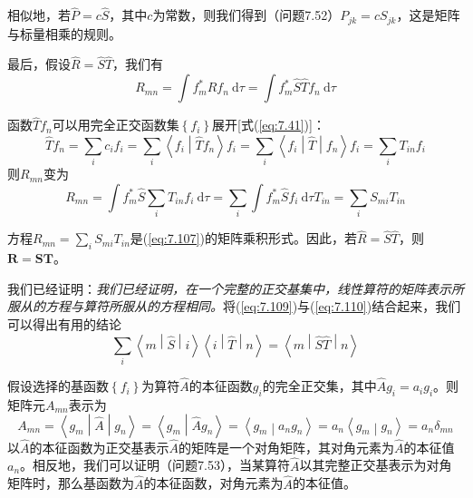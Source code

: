     相似地，若$\hat{P} = c\hat{S}$，其中$c$为常数，则我们得到（问题7.52）$P_{jk} = cS_{jk}$，这是矩阵与标量相乘的规则。

    最后，假设$\hat{R} = \hat{S}\hat{T}$，我们有
    \begin{equation}
        R_{mn} = \int f_m^{\ast}\hat{R}f_n \: \mathrm{d}\tau = \int f_m^{\ast}\hat{S}\hat{T}f_n \: \mathrm{d}\tau
        \label{eq:7.109}
    \end{equation}

    函数$\hat{T}f_n$可以用完全正交函数集$\left\{f_i\right\}$展开[式(\ref{eq:7.41})]：
    \begin{equation*}
        \hat{T}f_n = \sum_{i}c_{i}f_i = \sum_{i}\left\langle f_i \middle| \hat{T}f_n \right\rangle f_i = \sum_{i}\left\langle f_i \middle| \hat{T} \middle| f_n \right\rangle f_i = \sum_{i}T_{in}f_i
    \end{equation*}
    则$R_{mn}$变为
    \begin{equation}
        R_{mn} = \int f_m^{\ast}\hat{S}\sum_{i}T_{in}f_i \: \mathrm{d}\tau = \sum_{i}\int f_m^{\ast}\hat{S}f_i \: \mathrm{d}\tau T_{in} = \sum_{i}S_{mi}T_{in}
        \label{eq:7.110}
    \end{equation}

    方程$R_{mn} = \sum_{i}S_{mi}T_{in}$是(\ref{eq:7.107})的矩阵乘积形式。因此，若$\hat{R} = \hat{S}\hat{T}$，则$\mathbf{R} = \mathbf{S}\mathbf{T}$。

    我们已经证明：\textit{我们已经证明，在一个完整的正交基集中，线性算符的矩阵表示所服从的方程与算符所服从的方程相同。}将(\ref{eq:7.109})与(\ref{eq:7.110})结合起来，我们可以得出有用的结论
    \begin{equation}
        \sum_i\left\langle m \middle| \hat{S} \middle| i \right\rangle \left\langle i \middle| \hat{T} \middle| n \right\rangle = \left\langle m \middle| \hat{S}\hat{T} \middle| n \right\rangle
        \label{eq:7.111}
    \end{equation}

    假设选择的基函数$\left\{f_i\right\}$为算符$\hat{A}$的本征函数$g_i$的完全正交集，其中$\hat{A}g_i = a_ig_i$。则矩阵元$A_{mn}$表示为
    \begin{equation*}
        A_{mn} = \left\langle g_m \middle| \hat{A} \middle| g_n \right\rangle = \left\langle g_m \middle| \hat{A}g_n \right\rangle = \left\langle g_m \middle| a_ng_n \right\rangle = a_n \left\langle g_m \middle| g_n \right\rangle = a_n\delta_{mn}
    \end{equation*}
    以$\hat{A}$的本征函数为正交基表示$\hat{A}$的矩阵是一个对角矩阵，其对角元素为$\hat{A}$的本征值$a_n$。相反地，我们可以证明（问题7.53），当某算符$\hat{A}$以其完整正交基表示为对角矩阵时，那么基函数为$\hat{A}$的本征函数，对角元素为$\hat{A}$的本征值。

